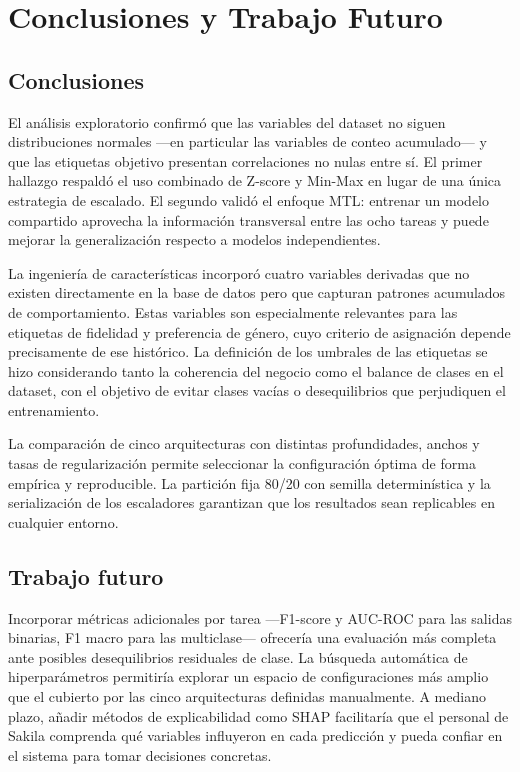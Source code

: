 \documentclass[12pt, a4paper]{report}
\begin{document}
\chapter{Conclusiones y Trabajo Futuro}
\label{cap:conclusiones}

\section{Conclusiones}

El análisis exploratorio confirmó que las variables del dataset no siguen distribuciones normales ---en particular las variables de conteo acumulado--- y que las etiquetas objetivo presentan correlaciones no nulas entre sí. El primer hallazgo respaldó el uso combinado de Z-score y Min-Max en lugar de una única estrategia de escalado. El segundo validó el enfoque MTL: entrenar un modelo compartido aprovecha la información transversal entre las ocho tareas y puede mejorar la generalización respecto a modelos independientes.

La ingeniería de características incorporó cuatro variables derivadas que no existen directamente en la base de datos pero que capturan patrones acumulados de comportamiento. Estas variables son especialmente relevantes para las etiquetas de fidelidad y preferencia de género, cuyo criterio de asignación depende precisamente de ese histórico. La definición de los umbrales de las etiquetas se hizo considerando tanto la coherencia del negocio como el balance de clases en el dataset, con el objetivo de evitar clases vacías o desequilibrios que perjudiquen el entrenamiento.

La comparación de cinco arquitecturas con distintas profundidades, anchos y tasas de regularización permite seleccionar la configuración óptima de forma empírica y reproducible. La partición fija 80/20 con semilla determinística y la serialización de los escaladores garantizan que los resultados sean replicables en cualquier entorno.

\section{Trabajo futuro}

Incorporar métricas adicionales por tarea ---F1-score y AUC-ROC para las salidas binarias, F1 macro para las multiclase--- ofrecería una evaluación más completa ante posibles desequilibrios residuales de clase. La búsqueda automática de hiperparámetros permitiría explorar un espacio de configuraciones más amplio que el cubierto por las cinco arquitecturas definidas manualmente. A mediano plazo, añadir métodos de explicabilidad como SHAP facilitaría que el personal de Sakila comprenda qué variables influyeron en cada predicción y pueda confiar en el sistema para tomar decisiones concretas.
\end{document}
